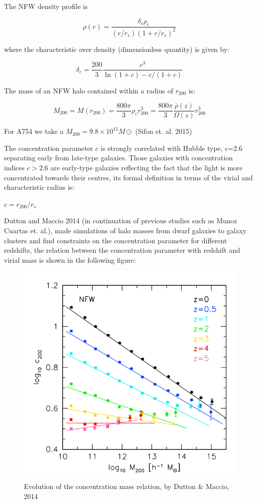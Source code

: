 The NFW density profile is 

\begin{equation}
\rho(r)=\frac{\delta_{c}\rho_{c}}{(r/r_{s})(1+r/r_{s})^{2}}
\end{equation}

where the characteristic over density (dimensionless quantity) is given by:

\begin{equation}
\delta_{c}=\frac{200}{3}\frac{c^{3}}{\ln{(1+c)}-c/(1+c)}
\end{equation}

The mass of an NFW halo contained within a radius of $r_{200}$ is:

\begin{equation}
M_{200}=M(r_{200})=\frac{800\pi}{3}\rho_{c}r^{3}_{200}=\frac{800\pi}{3}\frac{\bar{\rho}(z)}{\Omega(z)}r^{3}_{200}
\end{equation}

For A754 we take a $M_{200}=9.8\times 10^{15} M\odot$ (Sifon et. al. 2015)

The concentration parameter $c$ is strongly correlated with Hubble type, c=2.6 separating early from late-type galaxies. Those galaxies with concentration indices $c>2.6$ are early-type galaxies reflecting the fact that the light is more concentrated towards their centres, its formal definition in terms of the virial and characteristic radius is:

$c=r_{200}/r_{s}$

Dutton and Maccio 2014 (in continuation of previous studies such as Munoz Cuartas et. al.), made simulations of halo masses from dwarf galaxies to galaxy clusters and find constraints on the concentration parameter for different redshifts, the relation between the concentration parameter with redshift and virial mass is shown in the following figure:

\begin{figure}[H]
\centering
\includegraphics[width=12cm]{images/dutton.png}
\caption[Evolution of the concentration mass relation]{Evolution of the concentration mass relation, by Dutton \& Maccio, 2014}
\end{figure}

